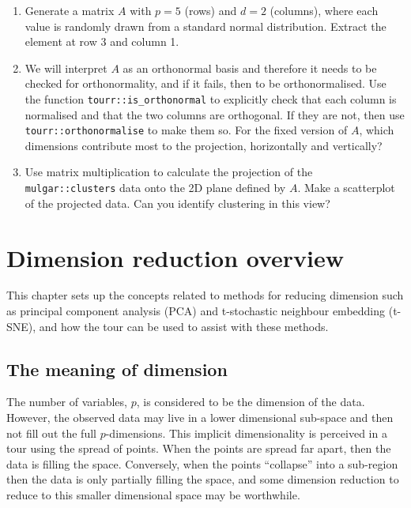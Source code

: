 \documentclass[
  letterpaper,
]{krantz}
\providecommand{\tightlist}{%
  \setlength{\itemsep}{0pt}\setlength{\parskip}{0pt}}\usepackage{longtable,booktabs,array}
\begin{document}
\begin{enumerate}
\def\labelenumi{\arabic{enumi}.}
\tightlist
\item
  Generate a matrix \(A\) with \(p=5\) (rows) and \(d=2\) (columns),
  where each value is randomly drawn from a standard normal
  distribution. Extract the element at row 3 and column 1.
\item
  We will interpret \(A\) as an orthonormal basis and therefore it needs
  to be checked for orthonormality, and if it fails, then to be
  orthonormalised. Use the function \texttt{tourr::is\_orthonormal} to
  explicitly check that each column is normalised and that the two
  columns are orthogonal. If they are not, then use
  \texttt{tourr::orthonormalise} to make them so. For the fixed version
  of \(A\), which dimensions contribute most to the projection,
  horizontally and vertically?
\item
  Use matrix multiplication to calculate the projection of the
  \texttt{mulgar::clusters} data onto the 2D plane defined by \(A\).
  Make a scatterplot of the projected data. Can you identify clustering
  in this view?
\end{enumerate}


\chapter{Dimension reduction overview}\label{sec-dimension-overview}

This chapter sets up the concepts related to methods for reducing
dimension such as principal component analysis (PCA) and t-stochastic
neighbour embedding (t-SNE), and how the tour can be used to assist with
these methods.

\section{The meaning of dimension}\label{the-meaning-of-dimension}

The number of variables, \(p\), is considered to be the dimension of the
data. However, the observed data may live in a lower dimensional
sub-space and then not fill out the full \(p\)-dimensions. This implicit
dimensionality is perceived in a tour using the spread of points. When
the points are spread far apart, then the data is filling the space.
Conversely, when the points ``collapse'' into a sub-region then the data
is only partially filling the space, and some dimension reduction to
reduce to this smaller dimensional space may be worthwhile.
\end{document}
